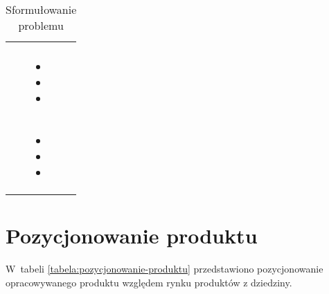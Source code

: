 \begin{minipage}{\textwidth}
    \begin{table}[H]
        \centering\caption{Sformułowanie problemu \source{\ownwork}\label{tabela:sformulowanie-problemu}}
        \begin{tabular}{|P{.2\textwidth}|p{.7\textwidth}|}

            \hline
             &
             \\
            \hline

             &
             \\
            \hline

             &
            \begin{itemize}
                \item {}
                \item {}
                \item {}
            \end{itemize} \\
            \hline

             &
            \begin{itemize}
                \item {}
                \item {}
                \item {}
            \end{itemize} \\
            \hline
        \end{tabular}
    \end{table}
\end{minipage}

\pagebreak
\section{Pozycjonowanie produktu}\label{sec:product-positioning}

\par
W~tabeli \ref{tabela:pozycjonowanie-produktu} przedstawiono pozycjonowanie opracowywanego produktu względem rynku produktów z dziedziny.

